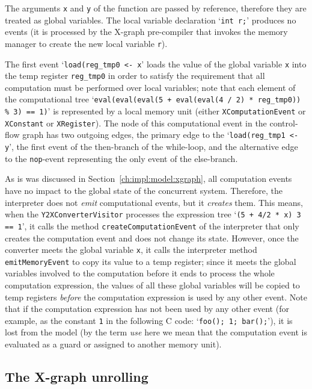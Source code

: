 The arguments \lstinline{x} and \lstinline{y} of the function are passed by reference, therefore they are treated as global variables.
The local variable declaration `\lstinline{int r;}' produces no events (it is processed by the X-graph pre-compiler that invokes the memory manager to create the new local variable \lstinline{r}).

The first event `\lstinline{load(reg_tmp0 <- x}' loads the value of the global variable \lstinline{x} into the temp register \lstinline{reg_tmp0} in order to satisfy the requirement that all computation must be performed over local variables;
note that each element of the computational tree `\lstinline{eval(eval(eval(5 + eval(eval(4 / 2) * reg_tmp0)) % 3) == 1)}' is represented by a local memory unit (either \texttt{XComputationEvent} or \texttt{XConstant} or \texttt{XRegister}).
The node of this computational event in the control-flow graph has two outgoing edges, the primary edge to the `\lstinline{load(reg_tmp1 <- y}', the first event of the then-branch of the while-loop, and the alternative edge to the \lstinline{nop}-event representing the only event of the else-branch.

As is was discussed in Section~\ref{ch:impl:model:xgraph}, all computation events have no impact to the global state of the concurrent system.
Therefore, the interpreter does not \textit{emit} computational events, but it \textit{creates} them.
This means, when the \texttt{Y2XConverterVisitor} processes the expression tree `\lstinline{(5 + 4/2 * x) 3 == 1}', it calls the method \texttt{createComputationEvent} of the interpreter that only creates the computation event and does not change its state.
However, once the converter meets the global variable \lstinline{x}, it calls the interpreter method \texttt{emitMemoryEvent} to copy its value to a temp register; since it meets the global variables involved to the computation before it ends to process the whole computation expression, the values of all these global variables will be copied to temp registers \textit{before} the computation expression is used by any other event.
Note that if the computation expression has not been used by any other event (for example, as the constant \lstinline{1} in the following C code: `\lstinline{foo(); 1; bar();}'), it is lost from the model (by the term \textit{use} here we mean that the computation event is evaluated as a guard or assigned to another memory unit).


\subsection{The X-graph unrolling}

